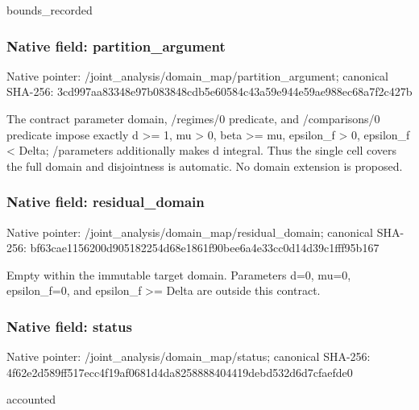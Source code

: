 \documentclass[10pt,a4paper]{article}
\begin{document}
\begingroup\raggedright\sloppy bounds\_\allowbreak{}recorded\par\endgroup

\subsubsection{Native field: partition\_\allowbreak{}argument}
Native pointer: /joint\_\allowbreak{}analysis/domain\_\allowbreak{}map/partition\_\allowbreak{}argument; canonical SHA-256: 3cd997aa83348e97b083848cdb5e60584c43a59e944e59ae988ec68a7f2c427b

\begingroup\raggedright\sloppy The contract parameter domain,\allowbreak{} /\allowbreak{}regimes/\allowbreak{}0 predicate,\allowbreak{} and /\allowbreak{}comparisons/\allowbreak{}0 predicate impose exactly d >=\allowbreak{} 1,\allowbreak{} mu > 0,\allowbreak{} beta >=\allowbreak{} mu,\allowbreak{} epsilon\_\allowbreak{}f > 0,\allowbreak{} epsilon\_\allowbreak{}f < Delta;\allowbreak{} /\allowbreak{}parameters additionally makes d integral. Thus the single cell covers the full domain and disjointness is automatic. No domain extension is proposed.\par\endgroup

\subsubsection{Native field: residual\_\allowbreak{}domain}
Native pointer: /joint\_\allowbreak{}analysis/domain\_\allowbreak{}map/residual\_\allowbreak{}domain; canonical SHA-256: bf63cae1156200d905182254d68e1861f90bee6a4e33cc0d14d39c1fff95b167

\begingroup\raggedright\sloppy Empty within the immutable target domain. Parameters d=\allowbreak{}0,\allowbreak{} mu=\allowbreak{}0,\allowbreak{} epsilon\_\allowbreak{}f=\allowbreak{}0,\allowbreak{} and epsilon\_\allowbreak{}f >=\allowbreak{} Delta are outside this contract.\par\endgroup

\subsubsection{Native field: status}
Native pointer: /joint\_\allowbreak{}analysis/domain\_\allowbreak{}map/status; canonical SHA-256: 4f62e2d589ff517ecc4f19af0681d4da8258888404419debd532d6d7cfaefde0

\begingroup\raggedright\sloppy accounted\par\endgroup
\end{document}
